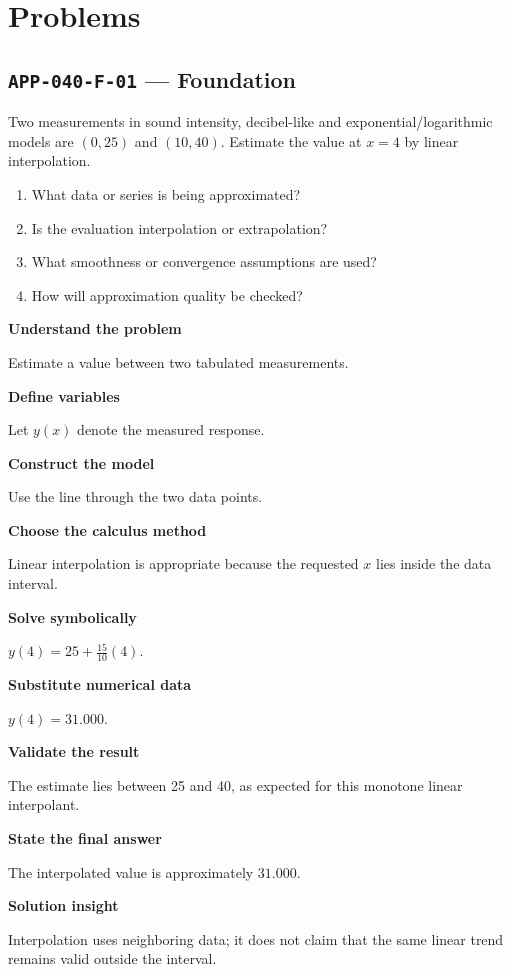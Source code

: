 \documentclass[11pt]{book}
\newcommand{\pid}[1]{\texttt{#1}}
\begin{document}
\section*{Problems}
\subsection*{\pid{APP-040-F-01} — Foundation}
\begin{problembox}
Two measurements in sound intensity, decibel-like and exponential/logarithmic models are $(0,25)$ and $(10,40)$. Estimate the value at $x=4$ by linear interpolation.
\end{problembox}
\begin{promptbox}\begin{enumerate}
\item What data or series is being approximated?
\item Is the evaluation interpolation or extrapolation?
\item What smoothness or convergence assumptions are used?
\item How will approximation quality be checked?
\end{enumerate}\end{promptbox}
\begin{solutionbox}
\textbf{Understand the problem}\par Estimate a value between two tabulated measurements.\par\medskip
\textbf{Define variables}\par Let $y(x)$ denote the measured response.\par\medskip
\textbf{Construct the model}\par Use the line through the two data points.\par\medskip
\textbf{Choose the calculus method}\par Linear interpolation is appropriate because the requested $x$ lies inside the data interval.\par\medskip
\textbf{Solve symbolically}\par $y(4)=25+\frac{15}{10}(4)$.\par\medskip
\textbf{Substitute numerical data}\par $y(4)=31.000$.\par\medskip
\textbf{Validate the result}\par The estimate lies between 25 and 40, as expected for this monotone linear interpolant.\par\medskip
\textbf{State the final answer}\par The interpolated value is approximately $31.000$.\par\medskip
\textbf{Solution insight}\par Interpolation uses neighboring data; it does not claim that the same linear trend remains valid outside the interval.\par\medskip
\end{solutionbox}
\end{document}
